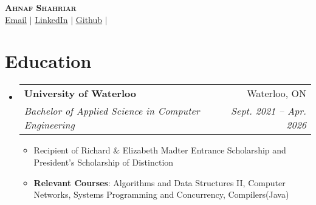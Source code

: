 \documentclass[letterpaper,11pt]{article}
\makeatletter
\newcommand{\resumeItem}[1]{
  \item\small{
    {#1 \vspace{-2pt}}
  }
}
\newcommand{\resumeSubheading}[4]{
  \vspace{-1pt}\item
    \begin{tabular*}{0.97\textwidth}[t]{l@{\extracolsep{\fill}}r}
      \textbf{#1} & #2 \\
      \textit{\small#3} & \textit{\small #4} \\
    \end{tabular*}\vspace{-7pt}
}
\newcommand{\resumeSubHeadingListStart}{\begin{itemize}[leftmargin=0.15in, label={}]}
\newcommand{\resumeSubHeadingListEnd}{\end{itemize}}
\newcommand{\resumeItemListStart}{\begin{itemize}}
\newcommand{\resumeItemListEnd}{\end{itemize}\vspace{-5pt}}
\makeatother
\begin{document}

\begin{center}
    \textbf{\Huge \scshape Ahnaf Shahriar} \\ \vspace{1pt}
    \small \href{mailto:ahnaf.shahriar@uwaterloo.ca}{\underline{Email}} $|$ 
    \href{https://linkedin.com/in/ahnaf-s}{\underline{LinkedIn}} $|$
    \href{https://github.com/shahriarAhnaf}{\underline{Github}} $|$
\end{center}


\section{Education}
  \resumeSubHeadingListStart
    \resumeSubheading
      {University of Waterloo}{Waterloo, ON}
      {Bachelor of Applied Science in Computer Engineering}{Sept. 2021 -- Apr. 2026}
    \resumeItemListStart
      \resumeItem{Recipient of Richard \& Elizabeth Madter Entrance Scholarship and President’s Scholarship of Distinction }
      \resumeItem{\textbf{Relevant Courses}: Algorithms and Data Structures II,  Computer Networks, Systems Programming and Concurrency, Compilers(Java)}

    \resumeItemListEnd
  \resumeSubHeadingListEnd


\end{document}
